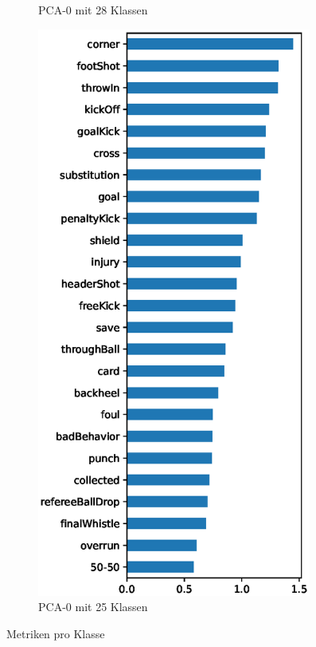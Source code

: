 \begin{figure}
\begin{subfigure}{.24\textwidth}
        \caption{PCA-0 \newline mit 28 Klassen}
    \end{subfigure}
    \begin{subfigure}{.24\textwidth}
        \centering
        \includegraphics[width=0.99\textwidth, keepaspectratio, interpolate]{img/07_pca_by_class_socc_har_25.eps}
        \caption{PCA-0 \newline mit 25 Klassen}
        \label{fig:pca_by_class_phase_3}
    \end{subfigure}
    \caption{Metriken pro Klasse}
    \label{fig:class-metrics}
\end{figure}

